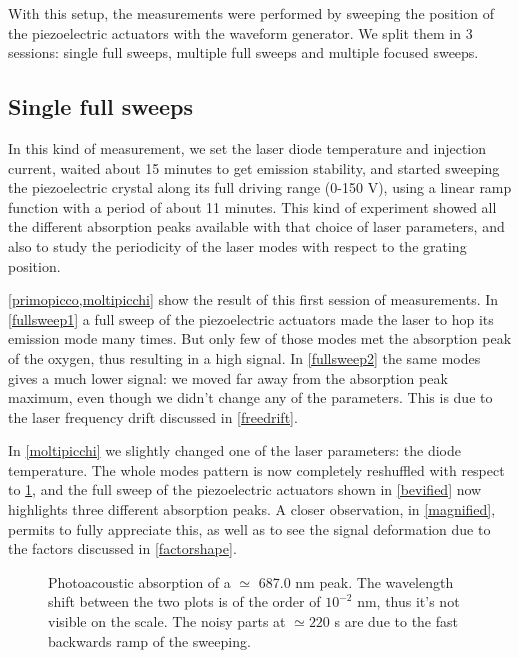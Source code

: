 With this setup, the measurements were performed by sweeping the position of the piezoelectric actuators with the waveform generator. We split them in 3 sessions: single full sweeps, multiple full sweeps and multiple focused sweeps.

\subsection{Single full sweeps} 
In this kind of measurement, we set the laser diode temperature and injection current, waited about 15 minutes to get emission stability, and started sweeping the piezoelectric crystal along its full driving range (0-150 V), using a linear ramp function with a period of about 11 minutes. This kind of experiment showed all the different absorption peaks available with that choice of laser parameters, and also to study the periodicity of the laser modes with respect to the grating position.

\medskip
\cref{primopicco,moltipicchi} show the result of this first session of measurements. In \cref{fullsweep1} a full sweep of the piezoelectric actuators made the laser to hop its emission mode many times. But only few of those modes met the absorption peak of the oxygen, thus resulting in a high signal. In \cref{fullsweep2} the same modes gives a much lower signal: we moved far away from the absorption peak maximum, even though we didn't change any of the parameters. This is due to the laser frequency drift discussed in \cref{freedrift}.

In \cref{moltipicchi} we slightly changed one of the laser parameters: the diode temperature. The whole modes pattern is now completely reshuffled with respect to \cref{primopicco}, and the full sweep of the piezoelectric actuators shown in \cref{bevified} now highlights three different absorption peaks. A closer observation, in \cref{magnified}, permits to fully appreciate this, as well as to see the signal deformation due to the factors discussed in \cref{factorshape}.
\begin{figure}[!hptb]\centering
{} 
\caption{Photoacoustic absorption of a $\simeq$ 687.0 nm peak. The wavelength shift between the two plots is of the order of $10^{-2}$ nm, thus it's not visible on the scale. The noisy parts at $\simeq220$ s are due to the fast backwards ramp of the sweeping.}\label{primopicco}
\end{figure}

